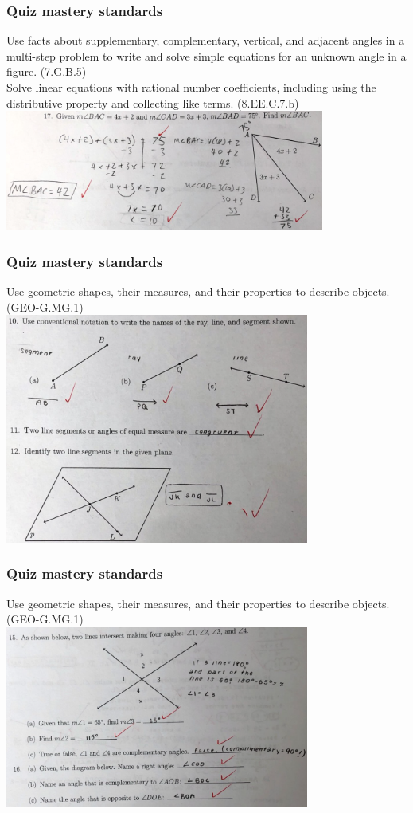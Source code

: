 \documentclass{beamer}
\begin{document}
\frame
{
  \frametitle{Quiz mastery standards}
  Use facts about supplementary, complementary, vertical, and adjacent angles in a multi-step problem to write and solve simple equations for an unknown angle in a figure. (7.G.B.5)\\[0.5cm]
  Solve linear equations with rational number coefficients, including using the distributive property and collecting like terms. (8.EE.C.7.b)\\
    \includegraphics[width=10.5cm]{model+solve.png}
}

\frame
{
  \frametitle{Quiz mastery standards}
   Use geometric shapes, their measures, and their properties to describe objects. (GEO-G.MG.1)\\
    \includegraphics[width=10cm]{notationA.png}
}

\frame
{
  \frametitle{Quiz mastery standards}
   Use geometric shapes, their measures, and their properties to describe objects. (GEO-G.MG.1)\\
    \includegraphics[width=10cm]{notationB.png}
}
\end{document}
